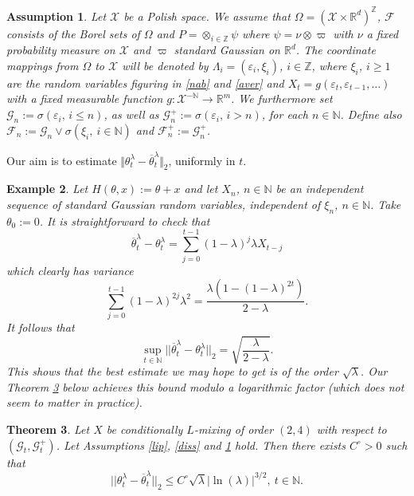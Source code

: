 \documentclass[a4paper,draft]{article}
\newtheorem{theorem}{Theorem}[section]
\newtheorem{example}[theorem]{Example}
\newtheorem{assumption}[theorem]{Assumption}
\begin{document}
\begin{assumption}\label{opa}
Let $\mathcal{X}$ be a Polish space.
We assume that $\Omega=(\mathcal{X}\times \mathbb{R}^d)^{\mathbb{Z}}$, $\mathcal{F}$ consists of the Borel sets of $\Omega$ and
$P=\otimes_{i\in\mathbb{Z}} \psi$ where $\psi=\nu\otimes\varpi$ with $\nu$ a fixed probability measure on $\mathcal{X}$ and $\varpi$ standard Gaussian
on $\mathbb{R}^d$.
The coordinate mappings from $\Omega$ to $\mathcal{X}$ will be denoted by $\Lambda_i=(\varepsilon_i,\xi_i)$, $i\in\mathbb{Z}$, where
$\xi_i$, $i\geq 1$ are the random variables figuring in \eqref{nab} and
\eqref{aver} and $X_t=g(\varepsilon_t,\varepsilon_{t-1},\ldots)$
with a fixed measurable function $g:\mathcal{X}^{-\mathbb{N}}\to\mathbb{R}^m$.
We furthermore set
$\mathcal{G}_n:=\sigma(\varepsilon_i,\, i\leq n)$, as well as $\mathcal{G}^+_n:=\sigma(\varepsilon_i,\, i>n)$,
for each $n\in\mathbb{N}$. Define also $\mathcal{F}_n:=\mathcal{G}_n\vee
\sigma(\xi_i,\ i\in\mathbb{N})$ and $\mathcal{F}_n^+:=\mathcal{G}_n^+$.
\end{assumption}



Our aim is to estimate 
$\Vert\theta^{\lambda}_t-\overline{\theta}^{\lambda}_t\Vert_2$,
uniformly in $t$. 

\begin{example} {\rm Let $H(\theta,x):=\theta+x$ and let $X_n$, $n\in\mathbb{N}$
be an independent sequence of standard Gaussian random variables,
independent of $\xi_n$, $n\in\mathbb{N}$. Take $\theta_0:=0$.
It is straightforward to check that 
$$
\overline{\theta}^{\lambda}_t-\theta^{\lambda}_t=\sum_{j=0}^{t-1}
(1-\lambda)^j \lambda X_{t-j}
$$
which clearly has variance 
$$
\sum_{j=0}^{t-1}(1-\lambda)^{2j}\lambda^2=\frac{\lambda(1-(1-\lambda)^{2t})}
{2-\lambda}.
$$
It follows that
$$
\sup_{t\in\mathbb{N}}||\overline{\theta}^{\lambda}_t-\theta^{\lambda}_t||_2=\sqrt{\frac{\lambda}{2-\lambda}}.
$$
This shows that the best estimate we may hope to get is of the
order $\sqrt{\lambda}$.
Our Theorem \ref{main} below achieves this bound modulo a logarithmic
factor (which does not seem to matter in practice).}
\end{example}

\begin{theorem}\label{main} Let $X$ be conditionally $L$-mixing
of order $(2,4)$ with respect to $(\mathcal{G}_t,\mathcal{G}_t^+)$. 
Let Assumptions \ref{lip}, \ref{diss} and
\ref{opa} hold. Then there exists $C^{\circ}>0$ such that 
\begin{equation}
||\theta^{\lambda}_t-\overline{\theta}^{\lambda}_t||_2
\leq C^{\circ}\sqrt{\lambda}|\ln(\lambda)|^{3/2},\ t\in\mathbb{N}.
\end{equation}
\end{theorem}
\end{document}
